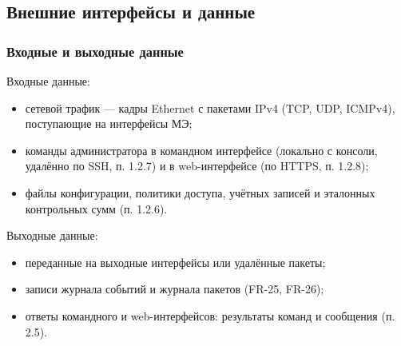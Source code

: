 \documentclass[13pt,a4paper,final]{article}
\begin{document}
	\subsection{Внешние интерфейсы и данные}
	\subsubsection{Входные и выходные данные}
	Входные данные:
	\begin{itemize}
		\item сетевой трафик — кадры Ethernet с пакетами IPv4 (TCP, UDP, ICMPv4), поступающие на интерфейсы МЭ;
		\item команды администратора в командном интерфейсе (локально с консоли, удалённо по SSH, п. 1.2.7) и в web-интерфейсе (по HTTPS, п. 1.2.8);
		\item файлы конфигурации, политики доступа, учётных записей и эталонных контрольных сумм (п. 1.2.6).
	\end{itemize}
	
	Выходные данные:
	\begin{itemize}
		\item переданные на выходные интерфейсы или удалённые пакеты;
		\item записи журнала событий и журнала пакетов (FR-25, FR-26);
		\item ответы командного и web-интерфейсов: результаты команд и сообщения (п. 2.5).
	\end{itemize}
	
\end{document}
